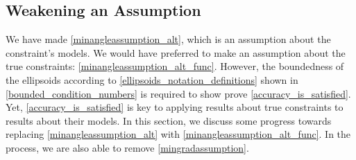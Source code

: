 
% 
% 






% 
% 
% 

\subsection{Weakening an Assumption}
\label{alternative_assumptions_section}

We have made \cref{minangleassumption_alt}, which is an assumption about the constraint's models.
We would have preferred to make an assumption about the true constraints: \cref{minangleassumption_alt_func}.
However, the boundedness of the ellipsoids according to \cref{ellipsoids_notation_definitions} shown in \cref{bounded_condition_numbers}
is required to show prove \cref{accuracy_is_satisfied}.
Yet, \cref{accuracy_is_satisfied} is key to applying results about true constraints to results about their models.
In this section, we discuss some progress towards replacing \cref{minangleassumption_alt} with \cref{minangleassumption_alt_func}.
In the process, we are also able to remove \cref{mingradassumption}.

